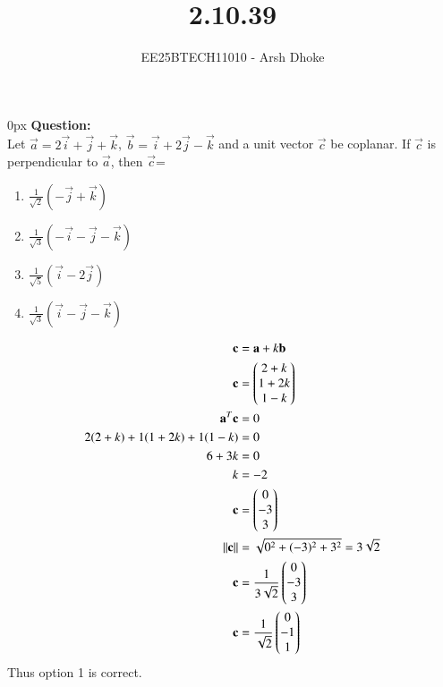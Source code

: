 \documentclass[journal]{IEEEtran}
\begin{document}

\vspace{3cm}

\title{2.10.39}
\author{EE25BTECH11010 - Arsh Dhoke}
{\let\newpage\relax\maketitle}

\renewcommand{\thefigure}{\theenumi}
\renewcommand{\thetable}{\theenumi}
\setlength{\intextsep}{10pt}
\renewcommand{\thetable}{\theenumi}

\parindent 0px
\textbf{Question:} \\
Let $\vec{a}=2\vec{i}+\vec{j}+\vec{k}$,\quad
$\vec{b}=\vec{i}+2\vec{j}-\vec{k}$ and a unit vector $\vec{c}$ be coplanar.
 If $\vec{c}$ is perpendicular to $\vec{a}$, then $\vec{c}$=

\begin{multicols}{2}
\begin{enumerate}
\item \( \frac{1}{\sqrt{2}}(-\vec{j}+\vec{k})\) \\
\item \( \frac{1}{\sqrt{3}}(-\vec{i}-\vec{j}-\vec{k})\) \\
\item \( \frac{1}{\sqrt{5}}(\vec{i}-2\vec{j})\) \\
\item \( \frac{1}{\sqrt{3}}(\vec{i}-\vec{j}-\vec{k})\) \\
\end{enumerate}
\end{multicols}



\begin{align}
\mathbf{c}&=\mathbf{a}+k\mathbf{b} \\
\mathbf{c}&=\begin{pmatrix}2+k\\1+2k\\1-k\end{pmatrix} \\
\mathbf{a}^T\mathbf{c}&=0 \\
2(2+k)+1(1+2k)+1(1-k)&=0 \\
6+3k&=0 \\
k&=-2 \\
\mathbf{c}&=\begin{pmatrix}0\\-3\\3\end{pmatrix} \\
\|\mathbf{c}\| &=\sqrt{0^2+(-3)^2+3^2}=3\sqrt{2} \\
\mathbf{c}&=\frac{1}{3\sqrt{2}}\begin{pmatrix}0\\-3\\3\end{pmatrix} \\
\mathbf{c}&=\frac{1}{\sqrt{2}}\begin{pmatrix}0\\-1\\1\end{pmatrix}
\end{align}
Thus option 1 is correct.
\end{document}
